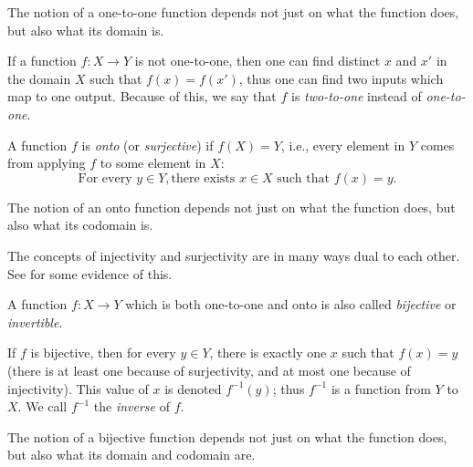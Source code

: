 \begin{note}
  The notion of a one-to-one function depends not just on what the function does, but also what its domain is.
\end{note}

\setcounter{thm}{15}
\begin{rmk}\label{i:3.3.16}
  If a function \(f : X \to Y\) is not one-to-one, then one can find distinct \(x\) and \(x'\) in the domain \(X\) such that \(f(x) = f(x')\), thus one can find two inputs which map to one output.
  Because of this, we say that \(f\) is \emph{two-to-one} instead of \emph{one-to-one}.
\end{rmk}

\begin{defn}\label{i:3.3.17}
  A function \(f\) is \emph{onto} (or \emph{surjective}) if \(f(X) = Y\), i.e., every element in \(Y\) comes from applying \(f\) to some element in \(X\):
  \[
    \text{For every } y \in Y, \text{there exists } x \in X \text{ such that } f(x) = y.
  \]
\end{defn}

\begin{note}
  The notion of an onto function depends not just on what the function does, but also what its codomain is.
\end{note}

\setcounter{thm}{18}
\begin{rmk}\label{i:3.3.19}
  The concepts of injectivity and surjectivity are in many ways dual to each other.
  See  for some evidence of this.
\end{rmk}

\begin{defn}\label{i:3.3.20}
  A function \(f : X \to Y\) which is both one-to-one and onto is also called \emph{bijective} or \emph{invertible}.

  If \(f\) is bijective, then for every \(y \in Y\), there is exactly one \(x\) such that \(f(x) = y\) (there is at least one because of surjectivity, and at most one because of injectivity).
  This value of \(x\) is denoted \(f^{-1}(y)\); thus \(f^{-1}\) is a function from \(Y\) to \(X\).
  We call \(f^{-1}\) the \emph{inverse} of \(f\).
\end{defn}

\begin{note}
  The notion of a bijective function depends not just on what the function does, but also what its domain and codomain are.
\end{note}

